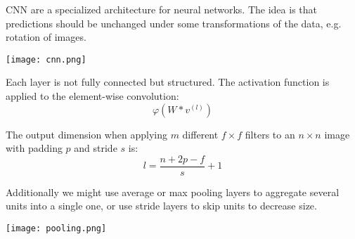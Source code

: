 CNN are a specialized architecture for neural networks. The idea is that predictions should be unchanged under some transformations of the data, e.g. rotation of images.

\begin{center}
	\texttt{[image: cnn.png]}
\end{center}

Each layer is not fully connected but structured. The activation function is applied to the element-wise convolution:
$$\varphi(W * v^{(l)})$$

The output dimension when applying $m$ different $f \times f$ filters to an $n \times n$ image with padding $p$ and stride $s$ is:
$$l = \frac{n + 2p - f}{s} + 1$$

Additionally we might use average or max pooling layers to aggregate several units into a single one, or use stride layers to skip units to decrease size.

\begin{center}
	\texttt{[image: pooling.png]}
\end{center}

